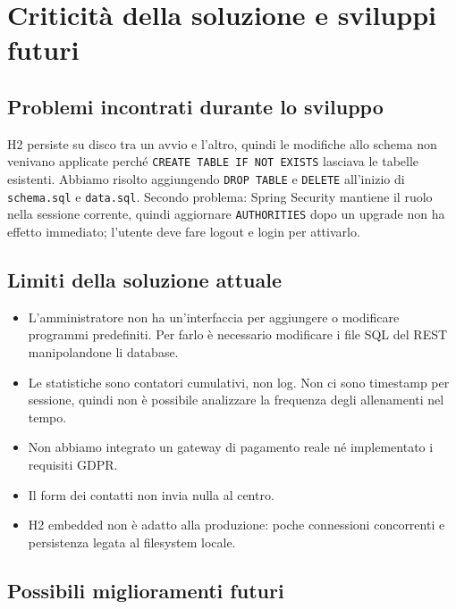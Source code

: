 \section{Criticità della soluzione e sviluppi futuri}

\subsection{Problemi incontrati durante lo sviluppo}
H2 persiste su disco tra un avvio e l'altro, quindi le modifiche allo schema non venivano applicate perché \texttt{CREATE TABLE IF NOT EXISTS} lasciava le tabelle esistenti. Abbiamo risolto aggiungendo \texttt{DROP TABLE} e \texttt{DELETE} all'inizio di \texttt{schema.sql} e \texttt{data.sql}. Secondo problema: Spring Security mantiene il ruolo nella sessione corrente, quindi aggiornare \texttt{AUTHORITIES} dopo un upgrade non ha effetto immediato; l'utente deve fare logout e login per attivarlo.

\subsection{Limiti della soluzione attuale}

\begin{itemize}
  \item L'amministratore non ha un'interfaccia per aggiungere o modificare programmi predefiniti. Per farlo è necessario modificare i file SQL del REST manipolandone li database.

  \item Le statistiche sono contatori cumulativi, non log. Non ci sono timestamp per sessione, quindi non è possibile analizzare la frequenza degli allenamenti nel tempo.

  \item Non abbiamo integrato un gateway di pagamento reale né implementato i requisiti GDPR.

  \item Il form dei contatti non invia nulla al centro.

  \item H2 embedded non è adatto alla produzione: poche connessioni concorrenti e persistenza legata al filesystem locale.
\end{itemize}

\subsection{Possibili miglioramenti futuri}

